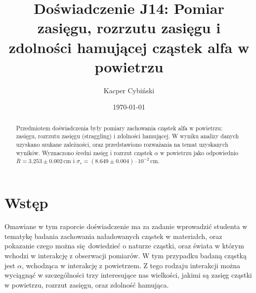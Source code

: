 \documentclass[12pt,a4paper]{article}
\begin{document}
\title{Doświadczenie J14: Pomiar zasięgu, rozrzutu zasięgu i zdolności hamującej cząstek alfa w powietrzu}
\author{\sc Kacper Cybiński}
\date{\today}



\begin{abstract}
    Przedmiotem doświadczenia były pomiary zachowania cząstek alfa w powietrzu: zasięgu, rozrzutu zasięgu (straggling) i zdolności hamującej. W wyniku analizy danych uzyskano szukane zależności, oraz przedstawiono rozważania na temat uzyskanych wyników. Wyznaczono średni zasięg i rozrzut cząstek $\alpha$ w powietrzu jako odpowiednio $\bar{R} = 3.253 \pm 0.002$\,cm i $\sigma_r = (8.649 \pm 0.004)\cdot 10^{-2}$\,cm.
\end{abstract}

\maketitle

\section{Wstęp}


Omawiane w tym raporcie doświadczenie ma za zadanie wprowadzić studenta w tematykę badania zachowania naładowanych cząstek w materiałch, oraz pokazanie czego można się dowiedzieć o naturze cząstki, oraz świata w którym wchodzi w interakcję z obserwacji pomiarów. W tym przypadku badaną cząstką jest $\alpha$, wchodząca w interakcję z powietrzem. Z tego rodzaju interakcji można wyciągnąć w szczególności trzy interesujące nas wielkości, jakimi są zasięg cząstki w powietrzu, rozrzut zasięgu, oraz zdolność hamująca.   
\end{document}
